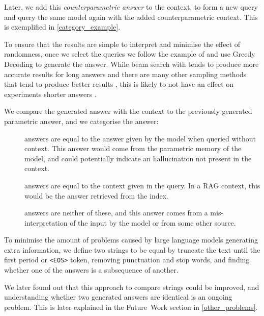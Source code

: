 Later, we add this \emph{counterparametric answer} to the context, to form a new query and query the same model again with the added counterparametric context.
This is exemplified in \cref{category_example}.

To ensure that the results are simple to interpret and minimise the effect of randomness, once we select the queries we follow the example of \citeauthor{ragged} and use Greedy Decoding to generate the answer.
While beam search with tends to produce more accurate results for long answers \citep{sutskever_seq2seqlearning,wu_mltranslation} and there are many other sampling methods that tend to produce better results \citep{text_degeneration}, this is likely to not have an effect on experiments shorter answers \citep{t5}.

We compare the generated answer with the context to the previously generated parametric answer, and we categorise the answer:
\begin{description}
	\item[\Parametric{}] answers are equal to the answer given by the model when queried without context.
		This answer would come from the parametric memory of the model, and could potentially indicate an hallucination not present in the context.
	\item[\Contextual{}] answers are equal to the context given in the query.
		In a RAG context, this would be the answer retrieved from the index.
	\item[\Other] answers are neither of these, and this answer comes from a mis-interpretation of the input by the model or from some other source.
\end{description}

To minimise the amount of problems caused by large language models generating extra information, we define two strings to be equal by truncate the text until the first period or \texttt{<EOS>} token, removing punctuation and stop words, and finding whether one of the answers is a subsequence of another.

We later found out that this approach to compare strings could be improved, and understanding whether two generated answers are identical is an ongoing problem.
This is later explained in the Future~Work section in \cref{other_problems}.


